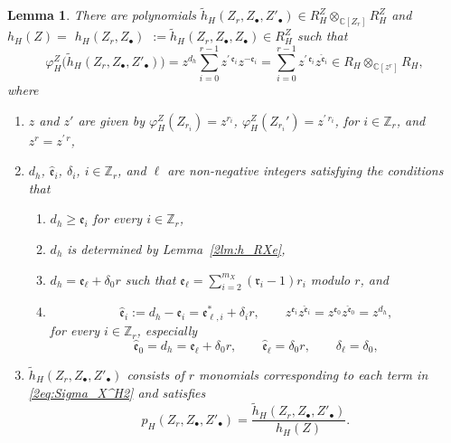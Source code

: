 \documentclass[10pt,a4paper]{amsart}
\def\CC{{\mathbb C}}
\def\ZZ{{\mathbb Z}}
\def\fe{{\mathfrak e}}
\def\fr{{\mathfrak r}}
\def\th{{\widetilde h}}
\def\hfe{{\widehat{\mathfrak e}}}
\numberwithin{equation}{section}
\newtheorem{Lemma}[Theorem]{Lemma}
\begin{document}
\begin{Lemma}\label{2lm:h_H}
There are polynomials $\th_{H}(Z_r, Z_\bullet, Z'_\bullet)\in R_H^Z \otimes_{\CC[Z_r]} R_H^Z$ and $h_H(Z)=$ $h_H(Z_r, Z_\bullet)$ $:= \th_{H}(Z_r, Z_\bullet, Z_\bullet)\in R_H^Z$ such that
\begin{equation}
\varphi_H^Z\big(\th_{H}(Z_r, Z_\bullet, Z'_\bullet)\big)=z^{d_h}\sum_{i=0}^{r-1}
z^{\prime\,\fe_i }z^{-\fe_i}=\sum_{i=0}^{r-1}z^{\prime\,\fe_i }z^{\hfe_i}
\in R_H \otimes_{\CC[z^r]} R_H,\label{2eq:Sigma_X^H2}
\end{equation}
where
\begin{enumerate}\itemsep=0pt
\item[$(1)$] $z$ and $z'$ are given by $\varphi_H^Z(Z_{r_i})=z^{r_i}$, $\varphi_H^Z(Z_{r_i}')=z^{\prime\, r_i}$, for $i \in \ZZ_r$, and $z^r = z^{\prime\, r}$,
\item[$(2)$] $d_h$, $\hfe_i$, $\delta_i$, $i\in \ZZ_r$, and $\ell$ are non-negative integers satisfying the conditions that
\begin{enumerate}\itemsep=0pt
\item[$(a)$] $d_h \ge \fe_i$ for every $i\in\ZZ_r$,
\item[$(b)$] $d_h$ is determined by Lemma~{\rm \ref{2lm:h_RXe}},
\item[$(c)$] $d_h = \fe_\ell+ \delta_0 r$ such that $\fe_\ell = \sum_{i=2}^{m_X} (\fr_i-1)r_i$ modulo $r$, and
\item[$(d)$]
\begin{equation}
\hfe_i:=d_h - \fe_i=\fe_{\ell,i}^*+\delta_i r,\qquad
z^{\fe_i}z^{\hfe_i}=z^{\fe_0}z^{\hfe_0}=z^{d_h},\label{2eq:hfe}
\end{equation}
for every $i\in\ZZ_r$, especially
\begin{equation}
\hfe_0 = d_h = \fe_\ell + \delta_0 r, \qquad
\hfe_\ell = \delta_0 r, \qquad \delta_\ell =\delta_0,
\label{2eq:hfe0}
\end{equation}
\end{enumerate}
\item[$(3)$] $\th_{H}(Z_r, Z_\bullet, Z'_\bullet)$ consists of $r$ monomials corresponding to each term in \eqref{2eq:Sigma_X^H2} and satisfies
\begin{equation}
p_{H}(Z_r, Z_\bullet, Z'_\bullet)=\frac{\th_{H}(Z_r, Z_\bullet, Z'_\bullet)}{h_H(Z)}.\label{2eq:hfe2}
\end{equation}
\end{enumerate}
\end{Lemma}
\end{document}
